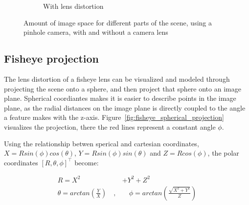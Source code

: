 \begin{figure}[!htb]
\begin{subfigure}[b]{0.45\textwidth}
    \caption{With lens distortion}
    \label{fig:wide_angle_pinhole_lens}
    \end{subfigure}
    
    \caption{Amount of image space for different parts of the scene, using a pinhole camera, with and without a camera lens}
    \label{fig:wide_angle_pinhole}
    
\end{figure}

\subsection{Fisheye projection}

The lens distortion of a fisheye lens can be visualized and modeled through projecting the scene onto a sphere, and then project that sphere onto an image plane. Spherical coordiantes makes it is easier to describe points in the image plane, as the radial distances on the image plane is directly coupled to the angle a feature makes with the z-axis. Figure~\ref{fig:fisheye_spherical_projection} visualizes the projection, there the red lines represent a constant angle $\phi$.

Using the relationship betwen sperical and cartesian coordinates, $X = Rsin(\phi)cos(\theta)$, $Y = Rsin(\phi)sin(\theta)$ and $Z = Rcos(\phi)$, the polar coordinates $[R,\theta,\phi]^\top$ become:

\begin{equation}
    \begin{aligned}
        R = X^2 &+ Y^2 + Z^2 \\
        \theta = arctan\left(\frac{Y}{X}\right)\quad  ,& \quad \phi = arctan\left(\frac{\sqrt{X^2 + Y^2}}{Z}\right)
    \end{aligned}
    \label{eq:theory_polar_coords}
\end{equation}


